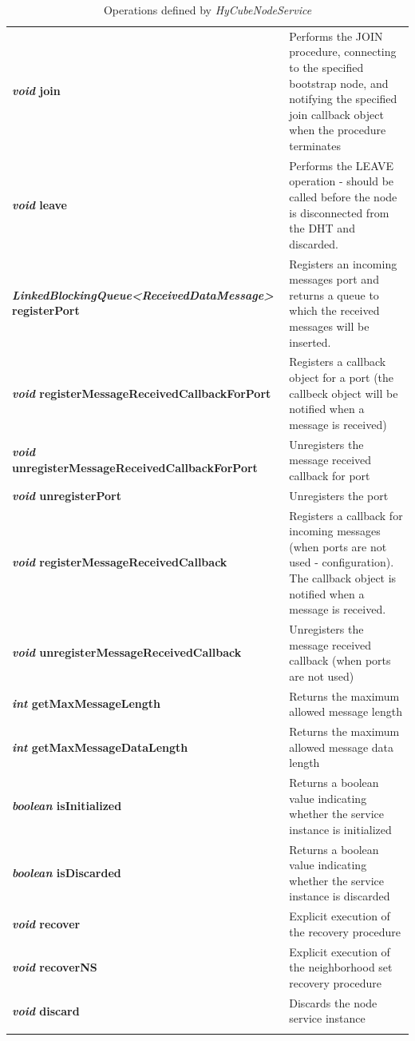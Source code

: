 \begin{center}
\begin{longtable}{p{6.5cm} p{8.5cm}}
	\textbf{\emph{void} join}													& Performs the JOIN procedure, connecting to the specified bootstrap node, and notifying the specified join callback object when the procedure terminates			\\[1.5mm]
	\textbf{\emph{void} leave}													& Performs the LEAVE operation - should be called before the node is disconnected from the DHT and discarded.			\\[1.5mm]
	\textbf{\emph{LinkedBlockingQueue<ReceivedDataMessage>} registerPort}		& Registers an incoming messages port and returns a queue to which the received messages will be inserted.				\\[1.5mm]
	\textbf{\emph{void} registerMessageReceivedCallbackForPort}					& Registers a callback object for a port (the callbeck object will be notified when a message is received)				\\[1.5mm]
	\textbf{\emph{void} unregisterMessageReceivedCallbackForPort}				& Unregisters the message received callback for port			\\[1.5mm]
	\textbf{\emph{void} unregisterPort}											& Unregisters the port		\\[1.5mm]
	\textbf{\emph{void} registerMessageReceivedCallback}						& Registers a callback for incoming messages (when ports are not used - configuration). The callback object is notified when a message is received.			\\[1.5mm]
	\textbf{\emph{void} unregisterMessageReceivedCallback}						& Unregisters the message received callback (when ports are not used)			\\[1.5mm]
	\textbf{\emph{int} getMaxMessageLength}										& Returns the maximum allowed message length			\\[1.5mm]
	\textbf{\emph{int} getMaxMessageDataLength}									& Returns the maximum allowed message data length		\\[1.5mm]
	\textbf{\emph{boolean} isInitialized}										& Returns a boolean value indicating whether the service instance is initialized			\\[1.5mm]
	\textbf{\emph{boolean} isDiscarded}											& Returns a boolean value indicating whether the service instance is discarded			\\[1.5mm]
	\textbf{\emph{void} recover}												& Explicit execution of the recovery procedure			\\[1.5mm]
	\textbf{\emph{void} recoverNS}												& Explicit execution of the neighborhood set recovery procedure			\\[1.5mm]
	\textbf{\emph{void} discard}												& Discards the node service instance		\\[1.5mm]
    \hline
\caption{Operations defined by \emph{HyCubeNodeService}}
\label{tab:libDescHyCubeNodeService}
\end{longtable}
\end{center}







